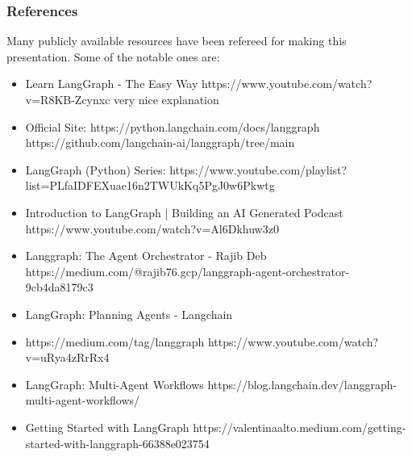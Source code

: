 \begin{frame}\frametitle{References}
Many publicly available resources have been refereed for making this presentation. Some of the notable ones are:
\footnotesize
\begin{itemize}
\item Learn LangGraph - The Easy Way https://www.youtube.com/watch?v=R8KB-Zcynxc very nice explanation
\item Official Site: https://python.langchain.com/docs/langgraph https://github.com/langchain-ai/langgraph/tree/main
\item LangGraph (Python) Series: https://www.youtube.com/playlist?list=PLfaIDFEXuae16n2TWUkKq5PgJ0w6Pkwtg
\item Introduction to LangGraph | Building an AI Generated Podcast https://www.youtube.com/watch?v=Al6Dkhuw3z0
\item Langgraph: The Agent Orchestrator - Rajib Deb https://medium.com/@rajib76.gcp/langgraph-agent-orchestrator-9cb4da8179c3
\item LangGraph: Planning Agents - Langchain 
\item https://medium.com/tag/langgraph https://www.youtube.com/watch?v=uRya4zRrRx4
\item LangGraph: Multi-Agent Workflows https://blog.langchain.dev/langgraph-multi-agent-workflows/
\item Getting Started with LangGraph https://valentinaalto.medium.com/getting-started-with-langgraph-66388e023754
\end{itemize}

\end{frame}